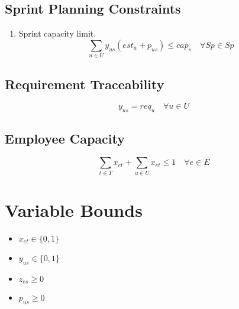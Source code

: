 \documentclass{article}
\begin{document}
\subsection{Sprint Planning Constraints}

\begin{enumerate}
    \item Sprint capacity limit.
    \begin{equation}
    \sum_{u \in U} y_{us} (est_{u} + p_{us}) \leq cap_{s} \quad \forall Sp \in Sp
    \end{equation}
\end{enumerate}

\subsection{Requirement Traceability}

\begin{equation}
y_{us} = req_{u} \quad \forall u \in U
\end{equation}

\subsection{Employee Capacity}

\begin{equation}
\sum_{t \in T} x_{et} +  \sum_{u \in U} x_{et} \leq 1 \quad \forall e \in E
\end{equation}

\section{Variable Bounds}

\begin{itemize}
    \item $x_{et} \in \{0, 1\}$
    \item $y_{us} \in \{0, 1\}$
    \item $z_{es} \geq 0$
    \item $p_{us} \geq 0$
\end{itemize}
\end{document}
